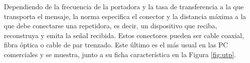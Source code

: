 
Dependiendo de la frecuencia de la portadora y la tasa de transferencia a la que transporta el mensaje, la norma especifica el conector y la distancia máxima a la que debe conectarse una repetidora, es decir, un dispositivo que reciba, reconstruya y emita la señal recibida. Estos conectores pueden ser cable coaxial, fibra óptica o cable de par trenzado. Este último es el más usual en las PC comerciales y se muestra, junto a su ficha característica en la Figura \ref{fig:utp}.%

